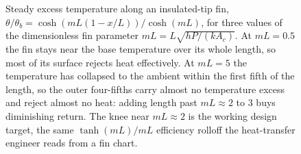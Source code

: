 \begin{figure}[htbp]
\centering
{}
\caption[Steady temperature along a cooling fin]{Steady excess
temperature along an insulated-tip fin,
$\theta/\theta_b = \cosh(mL(1-x/L))/\cosh(mL)$, for three values of
the dimensionless fin parameter $mL = L\sqrt{hP/(kA_c)}$. At $mL =
0.5$ the fin stays near the base temperature over its whole length,
so most of its surface rejects heat effectively. At $mL = 5$ the
temperature has collapsed to the ambient within the first fifth of
the length, so the outer four-fifths carry almost no temperature
excess and reject almost no heat: adding length past $mL \approx 2$
to $3$ buys diminishing return. The knee near $mL \approx 2$ is the
working design target, the same $\tanh(mL)/mL$ efficiency rolloff the
heat-transfer engineer reads from a fin chart.}
\label{fig:vol02:ch12:fin-profile}
\end{figure}
